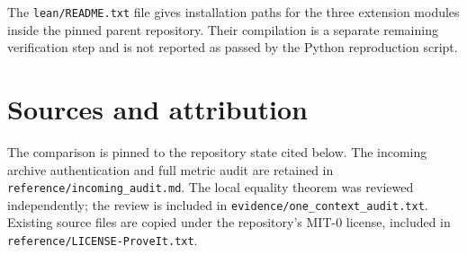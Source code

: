 \documentclass[11pt,letterpaper]{article}
\theoremstyle{definition}\newtheorem{definition}[theorem]{Definition}
\theoremstyle{remark}\newtheorem{remark}[theorem]{Remark}
\newcommand{\file}[1]{\texttt{\nolinkurl{#1}}}
\begin{document}
The \file{lean/README.txt} file gives installation paths for the three
extension modules inside the pinned parent repository. Their compilation
is a separate remaining verification step and is not reported as passed
by the Python reproduction script.

\section{Sources and attribution}
The comparison is pinned to the repository state cited below. The incoming
archive authentication and full metric audit are retained in
\file{reference/incoming_audit.md}. The local equality theorem was reviewed
independently; the review is included in
\file{evidence/one_context_audit.txt}. Existing source files are copied under
the repository's MIT-0 license, included in \file{reference/LICENSE-ProveIt.txt}.
\end{document}
